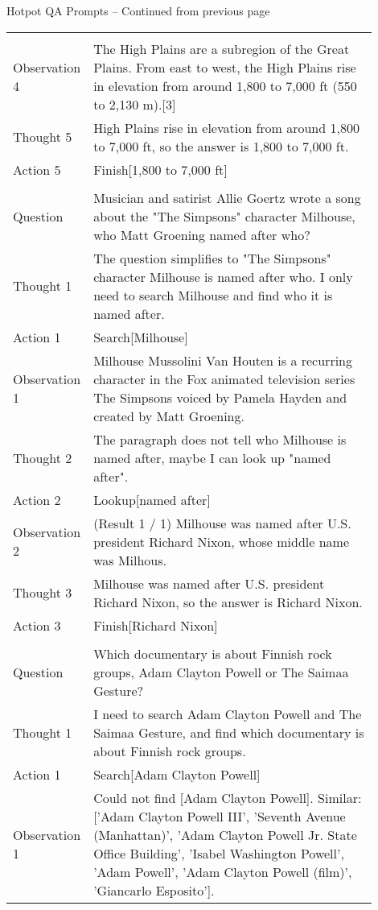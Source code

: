 \begin{table}[H]
\scriptsize
\begin{minipage}{0.9\linewidth}
Hotpot QA Prompts -- Continued from previous page
\centering
\ttfamily
\begin{tabular}{l p{0.9\linewidth}}
\midrule
\\
Observation 4 &  The High Plains are a subregion of the Great Plains. From east to west, the High Plains rise in elevation from around 1,800 to 7,000 ft (550 to 2,130 m).[3]\\
Thought 5 &  High Plains rise in elevation from around 1,800 to 7,000 ft, so the answer is 1,800 to 7,000 ft.\\
Action 5 &  Finish[1,800 to 7,000 ft]\\
\\
Question &  Musician and satirist Allie Goertz wrote a song about the "The Simpsons" character Milhouse, who Matt Groening named after who?\\
Thought 1 &  The question simplifies to "The Simpsons" character Milhouse is named after who. I only need to search Milhouse and find who it is named after.\\
Action 1 &  Search[Milhouse]\\
Observation 1 &  Milhouse Mussolini Van Houten is a recurring character in the Fox animated television series The Simpsons voiced by Pamela Hayden and created by Matt Groening.\\
Thought 2 &  The paragraph does not tell who Milhouse is named after, maybe I can look up "named after".\\
Action 2 &  Lookup[named after]\\
Observation 2 &  (Result 1 / 1) Milhouse was named after U.S. president Richard Nixon, whose middle name was Milhous. \\
Thought 3 &  Milhouse was named after U.S. president Richard Nixon, so the answer is Richard Nixon.\\
Action 3 &  Finish[Richard Nixon]\\
\\
Question &  Which documentary is about Finnish rock groups, Adam Clayton Powell or The Saimaa Gesture?\\
Thought 1 &  I need to search Adam Clayton Powell and The Saimaa Gesture, and find which documentary is about Finnish rock groups.\\
Action 1 &  Search[Adam Clayton Powell]\\
Observation 1 &  Could not find [Adam Clayton Powell]. Similar:  ['Adam Clayton Powell III', 'Seventh Avenue (Manhattan)', 'Adam Clayton Powell Jr. State Office Building', 'Isabel Washington Powell', 'Adam Powell', 'Adam Clayton Powell (film)', 'Giancarlo Esposito'].\\

\end{tabular}
\end{minipage}
\end{table}
